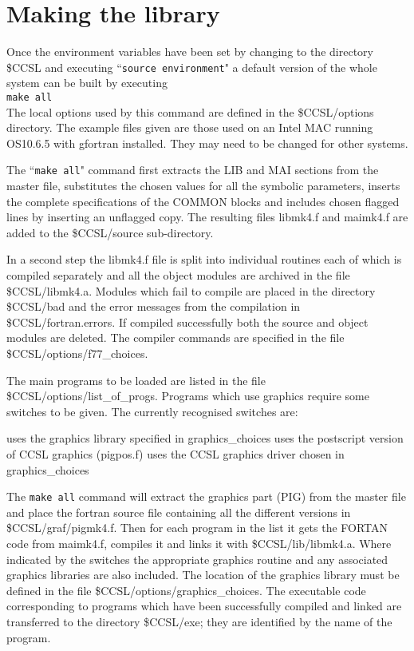 \documentclass[onecolumn,twoside,11pt,a4paper]{report}
\begin{document}
\section{Making the library}
Once the environment variables have been set by changing to the directory \$CCSL
and executing ``\texttt{source environment}" a default version of the whole  system
can be built by  executing\\  
\texttt{make all}\\
The local options used by this command are defined in the \$CCSL/options directory.
The example files given are those used on an Intel MAC running OS10.6.5 with gfortran installed. They
may need to be changed for other systems.
\par
The ``\texttt{make all}" command first extracts the LIB and MAI sections from the
master file, substitutes the chosen values for all the symbolic parameters,
inserts the complete specifications of the COMMON blocks and includes chosen
flagged lines by inserting an unflagged copy. The resulting files libmk4.f and
maimk4.f are added to the \$CCSL/source sub-directory. 
\par
In a second step the libmk4.f file is split into individual routines each of
which is compiled separately and all the object modules are archived in the file
\$CCSL/libmk4.a. Modules which fail to compile are placed in the directory
\$CCSL/bad and the error messages from the compilation in \$CCSL/fortran.errors.
If compiled successfully both the source and object modules are deleted. The
compiler commands are specified in the file \$CCSL/options/f77\_choices.
\par
The main programs to be loaded are listed in the file
\$CCSL/options/list\_of\_progs. Programs which use graphics require 
some switches to be given. The currently recognised switches are:
\begin{listdirectory}
    {uses the  graphics library specified in graphics\_choices}
   {uses the postscript version of CCSL graphics (pigpos.f)}
   {uses the CCSL graphics driver chosen in graphics\_choices}
\end{listdirectory}
The \texttt{make all} command will extract the graphics part (PIG) from the master file
and place the fortran source file containing all the different versions in
\$CCSL/graf/pigmk4.f. Then for each program in the list it gets the FORTAN code
from maimk4.f, compiles it and links it with \$CCSL/lib/libmk4.a. Where
indicated by the switches the appropriate graphics routine and any associated
graphics libraries are also included. The location of the graphics library must be
defined in the file \$CCSL/options/graphics\_choices. The executable code
corresponding to programs which have been successfully compiled and linked are
transferred to the directory \$CCSL/exe; they are identified by the name of the
program.
\end{document}
